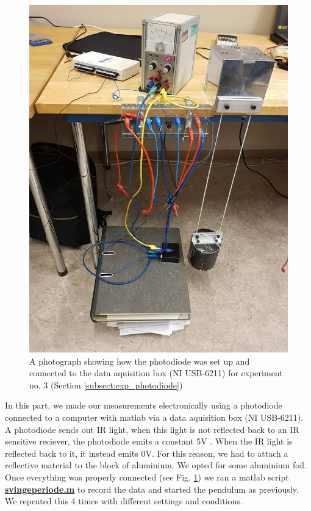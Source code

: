 \documentclass[%
 reprint,
 amsmath,amssymb,
 aps,
]{revtex4-1}
\begin{document}
        \begin{figure}
            \center
            \includegraphics[scale=0.3]{experiment3.jpg}
            \caption{A photograph showing how the photodiode was set up and connected to the data aquisition box (NI USB-6211) for experiment no. 3 (Section \ref{subsect:exp_photodiode})}
            \label{fig:pendulum3}
        \end{figure}

        In this part, we made our measurements electronically using a photodiode connected to a computer with matlab via a data aquisition box (NI USB-6211). A photodiode sends out IR light, when this light is not reflected back to an IR sensitive reciever, the photodiode emits a constant 5V . When the IR light is reflected back to it, it instead emits 0V. For this reason, we had to attach a reflective material to the block of aluminium. We opted for some aluminium foil.
        Once everything was properly connected (see Fig. \ref{fig:pendulum3}) we ran a matlab script \href{http://www.uio.no/studier/emner/matnat/fys/FYS2150/v18/kursmateriell/tid-og-frekvens/svingeperiode.m}{\textbf{svingeperiode.m}} to record the data and started the pendulum as previously. We repeated this 4 times with different settings and conditions.
\end{document}
